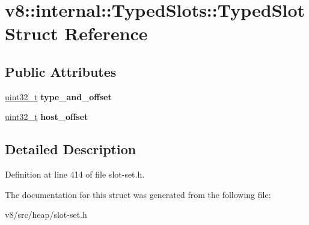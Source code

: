 \hypertarget{structv8_1_1internal_1_1TypedSlots_1_1TypedSlot}{}\section{v8\+:\+:internal\+:\+:Typed\+Slots\+:\+:Typed\+Slot Struct Reference}
\label{structv8_1_1internal_1_1TypedSlots_1_1TypedSlot}
\subsection*{Public Attributes}
\begin{DoxyCompactItemize}
\item 
\mbox{\label{structv8_1_1internal_1_1TypedSlots_1_1TypedSlot_a27ca52530ea18683d0ffa4be69f4add2}} 
\mbox{\hyperlink{classuint32__t}{uint32\+\_\+t}} {\bfseries type\+\_\+and\+\_\+offset}
\item 
\mbox{\label{structv8_1_1internal_1_1TypedSlots_1_1TypedSlot_ab2fe70444f150c3e3d46c640db677801}} 
\mbox{\hyperlink{classuint32__t}{uint32\+\_\+t}} {\bfseries host\+\_\+offset}
\end{DoxyCompactItemize}


\subsection{Detailed Description}


Definition at line 414 of file slot-\/set.\+h.



The documentation for this struct was generated from the following file\+:\begin{DoxyCompactItemize}
\item 
v8/src/heap/slot-\/set.\+h\end{DoxyCompactItemize}
